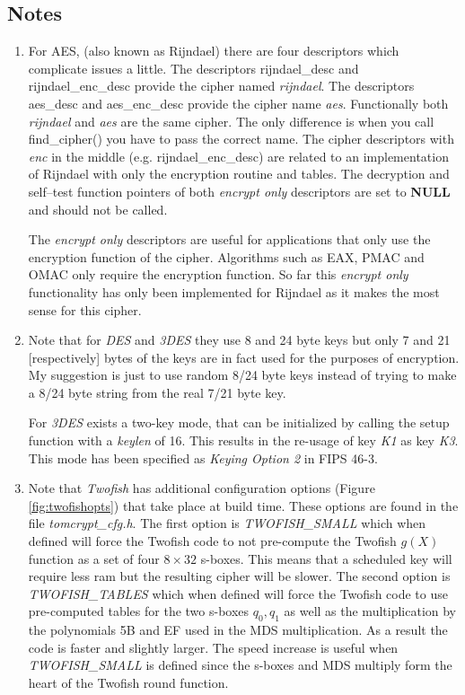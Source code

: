 \documentclass[synpaper]{book}
\begin{document}
\subsection{Notes}
\begin{small}
\begin{enumerate}
\item
For AES, (also known as Rijndael) there are four descriptors which complicate issues a little.  The descriptors 
rijndael\_desc and rijndael\_enc\_desc provide the cipher named \textit{rijndael}.  The descriptors aes\_desc and 
aes\_enc\_desc provide the cipher name \textit{aes}.  Functionally both \textit{rijndael} and \textit{aes} are the same cipher.  The
only difference is when you call find\_cipher() you have to pass the correct name.  The cipher descriptors with \textit{enc} 
in the middle (e.g. rijndael\_enc\_desc) are related to an implementation of Rijndael with only the encryption routine
and tables.  The decryption and self--test function pointers of both \textit{encrypt only} descriptors are set to \textbf{NULL} and 
should not be called.

The \textit{encrypt only} descriptors are useful for applications that only use the encryption function of the cipher.  Algorithms such
as EAX, PMAC and OMAC only require the encryption function.  So far this \textit{encrypt only} functionality has only been implemented for
Rijndael as it makes the most sense for this cipher.

\item
Note that for \textit{DES} and \textit{3DES} they use 8 and 24 byte keys but only 7 and 21 [respectively] bytes of the keys are in
fact used for the purposes of encryption.  My suggestion is just to use random 8/24 byte keys instead of trying to make a 8/24
byte string from the real 7/21 byte key.

For \textit{3DES} exists a two-key mode, that can be initialized by calling the setup function with a \textit{keylen} of 16. This results in the re-usage of key \textit{K1} as key \textit{K3}. This mode has been specified as \textit{Keying Option 2} in FIPS 46-3.

\item
Note that \textit{Twofish} has additional configuration options (Figure \ref{fig:twofishopts}) that take place at build time.  These options are found in
the file \textit{tomcrypt\_cfg.h}.  The first option is \textit{TWOFISH\_SMALL} which when defined will force the Twofish code
to not pre-compute the Twofish \textit{$g(X)$} function as a set of four $8 \times 32$ s-boxes.  This means that a scheduled
key will require less ram but the resulting cipher will be slower.  The second option is \textit{TWOFISH\_TABLES} which when
defined will force the Twofish code to use pre-computed tables for the two s-boxes $q_0, q_1$ as well as the multiplication
by the polynomials 5B and EF used in the MDS multiplication.  As a result the code is faster and slightly larger.  The
speed increase is useful when \textit{TWOFISH\_SMALL} is defined since the s-boxes and MDS multiply form the heart of the
Twofish round function.


\end{enumerate}
\end{small}
\end{document}

